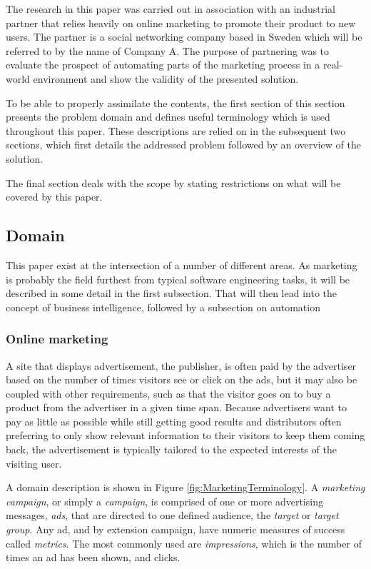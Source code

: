\documentclass{sig-alternate}
\begin{document}
The research in this paper was carried out in association with an industrial partner that relies heavily on online marketing to promote their product to new users. The partner is a social networking company based in Sweden which will be referred to by the name of Company A. The purpose of partnering was to evaluate the prospect of automating parts of the marketing process in a real-world environment and show the validity of the presented solution.

To be able to properly assimilate the contents, the first section of this section presents the problem domain and defines useful terminology which is used throughout this paper. These descriptions are relied on in the subsequent two sections, which first details the addressed problem followed by an overview of the solution.

The final section deals with the scope by stating restrictions on what will be covered by this paper.

\subsection{Domain}
This paper exist at the intersection of a number of different areas. As marketing is probably the field furthest from typical software engineering tasks, it will be described in some detail in the first subsection. That will then lead into the concept of business intelligence, followed by a subsection on automation

\subsubsection{Online marketing}
A site that displays advertisement, the publisher, is often paid by the advertiser based on the number of times visitors see or click on the ads, but it may also be coupled with other requirements, such as that the visitor goes on to buy a product from the advertiser in a given time span. Because advertisers want to pay as little as possible while still getting good results and distributors often preferring to only show relevant information to their visitors to keep them coming back, the advertisement is typically tailored to the expected interests of the visiting user.

A domain description is shown in Figure \ref{fig:MarketingTerminology}. A \emph{marketing campaign}, or simply a \emph{campaign}, is comprised of one or more advertising messages, \emph{ads}, that are directed to one defined audience, the \emph{target} or \emph{target group}. Any ad, and by extension campaign, have numeric measures of success called \emph{metrics}. The most commonly used are \emph{impressions}, which is the number of times an ad has been shown, and clicks.
\end{document}
